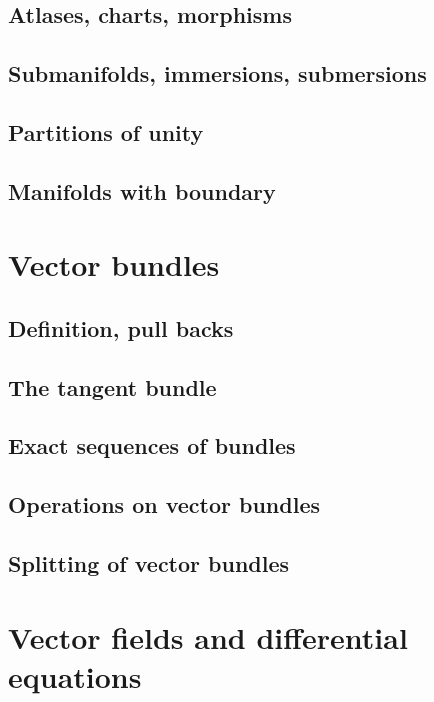 \documentclass[a4paper]{article}
\begin{document}
\subsection{Atlases, charts, morphisms}

\subsection{Submanifolds, immersions, submersions}

\subsection{Partitions of unity}

\subsection{Manifolds with boundary}

\section{Vector bundles}

\subsection{Definition, pull backs}

\subsection{The tangent bundle}

\subsection{Exact sequences of bundles}

\subsection{Operations on vector bundles}

\subsection{Splitting of vector bundles}

\section{Vector fields and differential equations}
\end{document}
